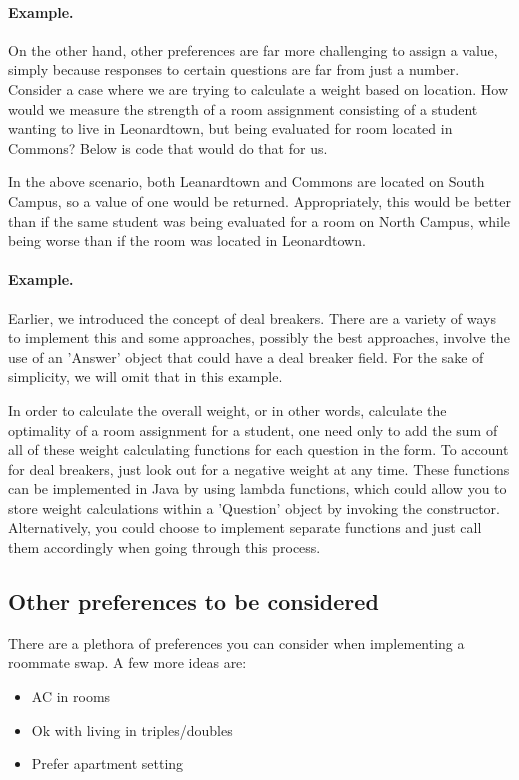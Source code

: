 \documentclass[12pt]{article}
\begin{document}
\paragraph{Example.}
On the other hand, other preferences are far more challenging to assign a value, simply because responses to certain questions are far from just a number. Consider a case where we are trying to calculate a weight based on location. How would we measure the strength of a room assignment consisting of a student wanting to live in Leonardtown, but being evaluated for room located in Commons? Below is code that would do that for us.

In the above scenario, both Leanardtown and Commons are located on South Campus, so a value of one would be returned. Appropriately, this would be better than if the same student was being evaluated for a room on North Campus, while being worse than if the room was located in Leonardtown. 
\paragraph{Example.}
Earlier, we introduced the concept of deal breakers. There are a variety of ways to implement this and some approaches, possibly the best approaches, involve the use of an 'Answer' object that could have a deal breaker field. For the sake of simplicity, we will omit that in this example.

In order to calculate the overall weight, or in other words, calculate the optimality of a room assignment for a student, one need only to add the sum of all of these weight calculating functions for each question in the form. To account for deal breakers, just look out for a negative weight at any time. These functions can be implemented in Java by using lambda functions, which could allow you to store weight calculations within a 'Question' object by invoking the constructor. Alternatively, you could choose to implement separate functions and just call them accordingly when going through this process.

\subsection{Other preferences to be considered}
There are a plethora of preferences you can consider when implementing a roommate swap. A few more ideas are:
\begin{itemize}[noitemsep]
\item AC in rooms
\item Ok with living in triples/doubles 
\item Prefer apartment setting
\end{itemize}
\end{document}
